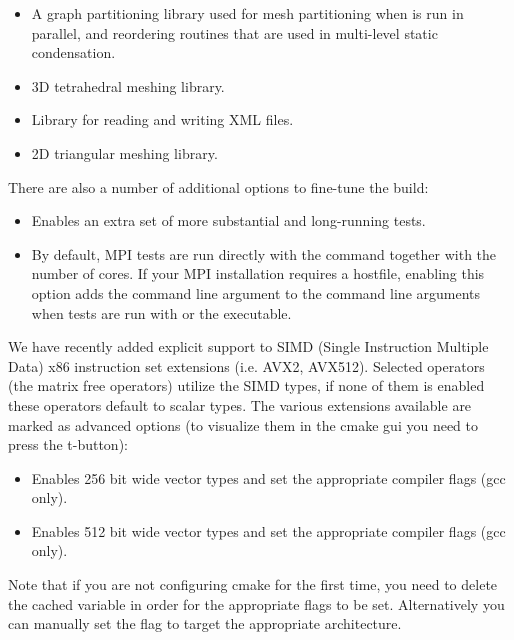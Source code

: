 \begin{itemize}
    \item {}

    A graph partitioning library used for mesh partitioning when \nekpp is run
    in parallel, and reordering routines that are used in multi-level static
    condensation.

    \item {}

    3D tetrahedral meshing library.

    \item {}

    Library for reading and writing XML files.

    \item {}

    2D triangular meshing library.
\end{itemize}

There are also a number of additional options to fine-tune the build:
\begin{itemize}

    \item {}

    Enables an extra set of more substantial and long-running tests.

    \item {}

    By default, MPI tests are run directly with the  command
    together with the number of cores. If your MPI installation requires a
    hostfile, enabling this option adds the command line argument
     to the command line arguments when tests are run
    with  or the  executable.
\end{itemize}

We have recently added explicit support to SIMD (Single Instruction Multiple Data) x86 instruction set extensions (i.e. AVX2, AVX512).
Selected operators (the matrix free operators) utilize the SIMD types, if none of them is enabled these operators default to scalar types.
The various extensions available are marked as advanced options (to visualize them in the cmake gui you need to press the t-button):
\begin{itemize}
    \item {}

    Enables 256 bit wide vector types and set the appropriate compiler flags (gcc only).

    \item {}

    Enables 512 bit wide vector types and set the appropriate compiler flags (gcc only).
\end{itemize}

Note that if you are not configuring cmake for the first time, you need to delete the cached variable  in order for the appropriate flags to be set. Alternatively you can manually set the flag to target the appropriate architecture.
